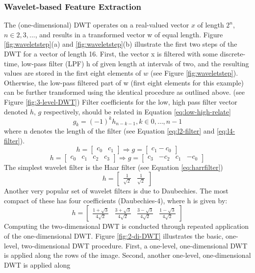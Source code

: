 \documentclass{article}
\newcommand{\irow}[1]{%
	\begin{bmatrix}#1\end{bmatrix}%
}
\begin{document}
	\subsubsection{Wavelet-based Feature Extraction}
	The (one-dimensional) DWT operates on a real-valued vector $x$ of length $2^n$, $n \in {2, 3, . . . }$, and results in
	a transformed vector w of equal length. Figure \ref{fig:waveletstep}(a) and \ref{fig:waveletstep}(b) illustrate the first two steps of the DWT for a
	vector of length 16. First, the vector x is filtered with some discrete-time, low-pass filter (LPF) h of given
	length at intervals of two, and the resulting values are stored in the first eight elements of $w$ (see Figure \ref{fig:waveletstep}).
	Otherwise, the low-pass filtered part of w (first eight elements for this example) can be further transformed using the identical procedure as outlined above. (see Figure \ref{fig:3-level-DWT})
	Filter coefficients for the low, high pass filter vector denoted $h$, $g$ respectively, should be related in Equation \ref{eq:low-high-relate}
	\begin{equation}
		g_k = (-1)^k h_{n-k-1}, k \in {0, \dots, n - 1}
		\label{eq:low-high-relate}
	\end{equation}
	where n denotes the length of the filter (see Equation \ref{eq:l2-filter} and \ref{eq:l4-filter}).
	\begin{equation}
		h = \irow{c_0 & c_1} \Rightarrow g = \irow{c_1 -c_0}
		\label{eq:l2-filter}
	\end{equation}
	\begin{equation}
		h = \irow{c_0 & c_1 & c_2 & c_3} \Rightarrow g = \irow{c_3 & -c_2 & c_1 &-c_0}
		\label{eq:l4-filter}
	\end{equation}
	The simplest wavelet filter is the Haar filter (see Equation \ref{eq:harrfilter})
	\begin{equation}
		h = \irow{\frac{1}{\sqrt{2}} & \frac{1}{\sqrt{2}}}
		\label{eq:harrfilter}
	\end{equation}
	Another very popular set of wavelet	filters is due to Daubechies. The most compact of these has four coefficients (Daubechies-4), where h is given by:
	\begin{equation}
		h = \irow{\frac{1 + \sqrt{3}}{4\sqrt{2}} & \frac{3 + \sqrt{3}}{4\sqrt{2}}
			& \frac{3 - \sqrt{3}}{4\sqrt{2}} & \frac{1 - \sqrt{3}}{4\sqrt{2}}}
		\label{eq:daubechies}
	\end{equation}
	Computing the two-dimensional DWT is conducted through repeated application of the one-dimensional DWT. Figure \ref{fig:2-di-DWT} illustrates the basic, one-level, two-dimensional DWT procedure. First, a one-level, one-dimensional DWT is applied along the rows of the image. Second, another one-level, one-dimensional DWT is applied along
\end{document}
